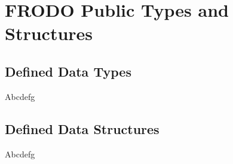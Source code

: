 \chapter{FRODO Public Types and Structures}


\section{Defined Data Types}

Abcdefg


\section{Defined Data Structures}

Abcdefg